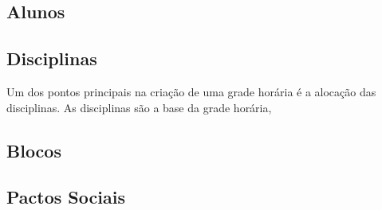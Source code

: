 \subsection{Alunos}

\subsection{Disciplinas} %

Um dos pontos principais na criação de uma grade horária é a alocação das disciplinas. As disciplinas são a base da grade horária,


\subsection{Blocos}


\subsection{Pactos Sociais}

